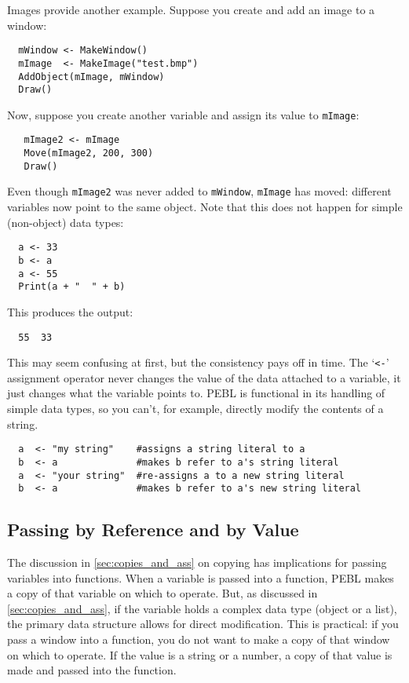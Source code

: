 Images provide another example. Suppose you create and add an image to a window:
\begin{verbatim}
  mWindow <- MakeWindow()
  mImage  <- MakeImage("test.bmp")
  AddObject(mImage, mWindow)
  Draw()
\end{verbatim}
Now, suppose you create another variable and assign its
value to \texttt{mImage}:
\begin{verbatim}
   mImage2 <- mImage
   Move(mImage2, 200, 300)
   Draw()
\end{verbatim}
Even though \texttt{mImage2} was never added to \texttt{mWindow}, \texttt{mImage}
has moved: different variables now point to the same object. Note that this does not happen for simple (non-object) data types:
\begin{verbatim}
  a <- 33
  b <- a
  a <- 55
  Print(a + "  " + b)
\end{verbatim}
This produces the output:
\begin{verbatim}
  55  33
\end{verbatim} 
This may seem confusing at first, but the consistency pays off in
time.  The `\verb+<-+' assignment operator never changes the value of
the data attached to a variable, it just changes what the variable
points to.  PEBL is functional in its handling of simple data types,
so you can't, for example, directly modify the contents of a string.
\begin{verbatim}
  a  <- "my string"    #assigns a string literal to a
  b  <- a              #makes b refer to a's string literal
  a  <- "your string"  #re-assigns a to a new string literal
  b  <- a              #makes b refer to a's new string literal
\end{verbatim}



\subsection{Passing by Reference and by Value}

The discussion in \ref{sec:copies_and_ass} on copying has implications for passing
variables into functions.  When a variable is passed into a function, PEBL makes a copy of that variable on which to operate. But, as discussed in \ref{sec:copies_and_ass}, if the variable holds a complex data
type (object or a list), the primary data structure allows for direct modification.  This is practical: if you pass a
window into a function, you do not want to make a copy of
that window on which to operate.  If the value is a string or a
number, a copy of that value is made and passed into the function.
  
